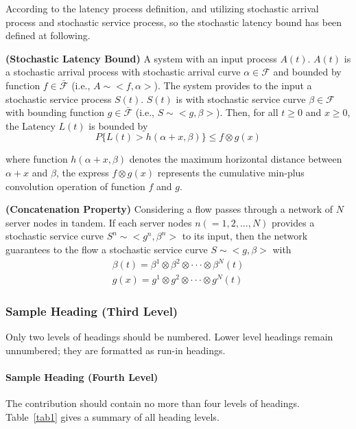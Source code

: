 \documentclass[runningheads]{llncs}
\begin{document}
According to the latency process definition, and utilizing stochastic arrival process and stochastic service process, so the stochastic latency bound has been defined at following.

\begin{theorem}\label{thrm_latency}{\bfseries (Stochastic Latency Bound)}
A system with an input process $A(t)$.
$A(t)$ is a stochastic arrival process with stochastic arrival curve $\alpha \in \mathcal{F}$ and bounded by function $f \in \mathcal{\bar{F}}$ (i.e., $A \sim <f, \alpha>$).
The system provides to the input a stochastic service process $S(t)$.
$S(t)$ is with stochastic service curve $\beta \in \mathcal{F}$ with bounding function $g \in \mathcal{\bar{F}}$ (i.e., $S \sim <g, \beta>$).
Then, for all $t\geq 0$ and $x \geq 0$, the Latency $L(t)$ is bounded by
\begin{equation}
P\{L(t)>h(\alpha+x, \beta)\}\leq f \otimes g(x)
\end{equation}
\end{theorem}
where function $h(\alpha+x, \beta)$ denotes the maximum horizontal distance between $\alpha+x$ and $\beta$, the express $f \otimes g(x)$ represents the cumulative min-plus convolution operation of function $f$ and $g$.

\begin{theorem}\label{thrm_concatenation}{\bfseries (Concatenation Property)}
Considering a flow passes through a network of $N$ server nodes in tandem.
If each server nodes $n(=1,2,...,N)$ provides a stochastic service curve $S^{n}\sim<g^{n}, \beta^{n}>$ to its input, then the network guarantees to the flow a stochastic service curve $S\sim<g,\beta>$ with
\begin{align*}
\beta(t)=\beta^{1}\otimes\beta^{2}\otimes\cdot\cdot\cdot\otimes\beta^{N}(t) \\
g(x)=g^{1}\otimes g^{2}\otimes\cdot\cdot\cdot\otimes g^{N}(t)
\end{align*}
\end{theorem}


\subsubsection{Sample Heading (Third Level)} Only two levels of
headings should be numbered. Lower level headings remain unnumbered;
they are formatted as run-in headings.

\paragraph{Sample Heading (Fourth Level)}
The contribution should contain no more than four levels of
headings. Table~\ref{tab1} gives a summary of all heading levels.
\end{document}
